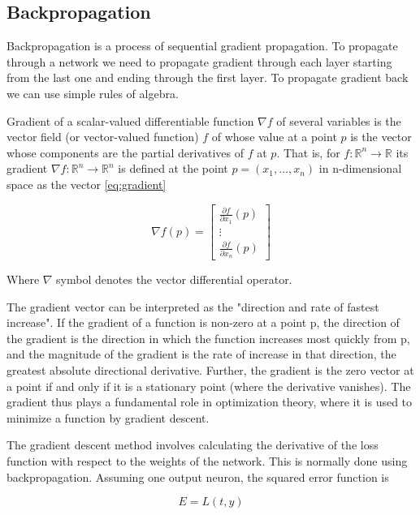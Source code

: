 \subsection{Backpropagation}

Backpropagation is a process of sequential gradient propagation. To propagate through a network we need to propagate gradient through each layer starting from the last one and ending through the first layer. To propagate gradient back we can use simple rules of algebra.

Gradient of a scalar-valued differentiable function $\nabla f$ of several variables is the vector field (or vector-valued function) $f$ of whose value at a point $p$ is the vector whose components are the partial derivatives of $f$ at $p$. That is, for $f\colon \mathbb {R} ^{n}\to \mathbb {R}$ its gradient $\nabla f\colon \mathbb {R} ^{n}\to \mathbb {R} ^{n}$ is defined at the point $p=(x_{1},\ldots ,x_{n})$ in n-dimensional space as the vector \ref{eq:gradient}

\begin{equation}
    \label{eq:gradient}
    \nabla f(p)=
    \begin{bmatrix}{
        \frac {\partial f}{\partial x_{1}}}(p) \\\vdots \\{\frac {\partial f}{\partial x_{n}}}(p)
    \end{bmatrix}
\end{equation}

Where $\nabla$ symbol denotes the vector differential operator.

The gradient vector can be interpreted as the "direction and rate of fastest increase". If the gradient of a function is non-zero at a point p, the direction of the gradient is the direction in which the function increases most quickly from p, and the magnitude of the gradient is the rate of increase in that direction, the greatest absolute directional derivative. Further, the gradient is the zero vector at a point if and only if it is a stationary point (where the derivative vanishes). The gradient thus plays a fundamental role in optimization theory, where it is used to minimize a function by gradient descent.

The gradient descent method involves calculating the derivative of the loss function with respect to the weights of the network. This is normally done using backpropagation. Assuming one output neuron, the squared error function is

\begin{equation}
    \label{eq:gradient_error}
    E=L(t,y)
\end{equation}

